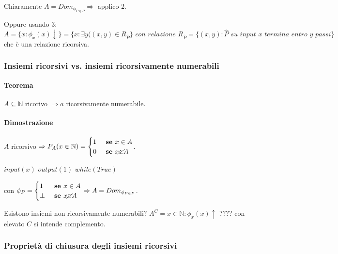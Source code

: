 \documentclass{article}
\begin{document}
			
Chiaramente $A=Dom_{\phi_{P \in P}}\Rightarrow$ applico 2. 




Oppure usando 3:
\begin{displaymath}
	A=\{ x: \phi_x(x)\downarrow \} = \{ x: \exists y ((x,y) \in R_{\hat{P}} \} \textit{ con relazione } R_{\hat{P}}=\{ (x,y): \hat{P} \textit{ su input $x$ termina entro $y$ passi} \}
\end{displaymath}			
			che è una relazione ricorsiva.
			
\subsubsection{Insiemi ricorsivi vs. insiemi ricorsivamente numerabili}
\paragraph{Teorema} $A \subseteq \mathbb{N}$ ricorivo $\Rightarrow a$ ricorsivamente numerabile.
\paragraph{Dimostrazione} $A$ ricorsivo $\Rightarrow P_A(x \in \mathbb{N})=\begin{cases}
	1 &\textbf{ se } x \in A \\
	0 &\textbf{ se } x \cancel{\in} A  \end{cases}$.
	
\begin{algorithm}[h]
	\caption{$P \equiv$}
        \begin{algorithmic}[1]
        		 \State $input(x)$
        		 	\State $output(1)$
        		 \Else
        		 	\State $while(True)$
        		 \EndIf
        		  
        \end{algorithmic}
    \end{algorithm}
    
con $\phi_P=\begin{cases}
	1 &\textbf{ se } x \in A \\
	\perp &\textbf{ se } x \cancel{\in} A  \end{cases} \Rightarrow A=Dom_{\phi_{P \in P}}$. 




Esistono insiemi non ricorsivamente numerabili? $A^C={x \in \mathbb{N}:\phi_x(x)\uparrow}$ ???? con elevato $C$ si intende complemento.


\subsubsection{Proprietà di chiusura degli insiemi ricorsivi}
\end{document}
